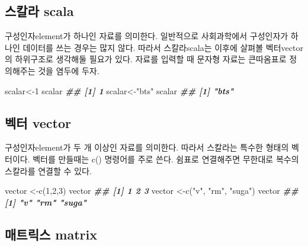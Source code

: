 \documentclass[
]{book}
\newenvironment{Shaded}{\begin{snugshade}}{\end{snugshade}}
\newcommand{\DecValTok}[1]{\textcolor[rgb]{0.00,0.00,0.81}{#1}}
\newcommand{\DocumentationTok}[1]{\textcolor[rgb]{0.56,0.35,0.01}{\textbf{\textit{#1}}}}
\newcommand{\FunctionTok}[1]{\textcolor[rgb]{0.00,0.00,0.00}{#1}}
\newcommand{\NormalTok}[1]{#1}
\newcommand{\OtherTok}[1]{\textcolor[rgb]{0.56,0.35,0.01}{#1}}
\newcommand{\StringTok}[1]{\textcolor[rgb]{0.31,0.60,0.02}{#1}}
\theoremstyle{definition}
\theoremstyle{definition}
\theoremstyle{definition}
\theoremstyle{definition}
\theoremstyle{remark}
\begin{document}
\hypertarget{uxc2a4uxce7cuxb77c-scala}{%
\subsection{스칼라 scala}\label{uxc2a4uxce7cuxb77c-scala}}

구성인자element가 하나인 자료를 의미한다. 일반적으로 사회과학에서 구성인자가 하나인 데이터를 쓰는 경우는 많지 않다. 따라서 스칼라scala는 이후에 살펴볼 벡터vector의 하위구조로 생각해둘 필요가 있다. 자료를 입력할 때 문자형 자료는 큰따옴표로 정의해주는 것을 염두에 두자.

\begin{Shaded}
\begin{Highlighting}[]
\NormalTok{scalar}\OtherTok{\textless{}{-}}\DecValTok{1}
\NormalTok{scalar}
\DocumentationTok{\#\# [1] 1}
\NormalTok{scalar}\OtherTok{\textless{}{-}}\StringTok{"bts"}
\NormalTok{scalar}
\DocumentationTok{\#\# [1] "bts"}
\end{Highlighting}
\end{Shaded}

\hypertarget{uxbca1uxd130-vector}{%
\subsection{벡터 vector}\label{uxbca1uxd130-vector}}

구성인자element가 두 개 이상인 자료를 의미한다. 따라서 스칼라는 특수한 형태의 벡터이다. 벡터를 만들때는 c() 명령어를 주로 쓴다. 쉼표로 연결해주면 무한대로 복수의 스칼라를 연결할 수 있다.

\begin{Shaded}
\begin{Highlighting}[]
\NormalTok{vector }\OtherTok{\textless{}{-}}\FunctionTok{c}\NormalTok{(}\DecValTok{1}\NormalTok{,}\DecValTok{2}\NormalTok{,}\DecValTok{3}\NormalTok{)}
\NormalTok{vector}
\DocumentationTok{\#\# [1] 1 2 3}
\NormalTok{vector }\OtherTok{\textless{}{-}}\FunctionTok{c}\NormalTok{(}\StringTok{"v"}\NormalTok{, }\StringTok{"rm"}\NormalTok{, }\StringTok{"suga"}\NormalTok{)}
\NormalTok{vector}
\DocumentationTok{\#\# [1] "v"    "rm"   "suga"}
\end{Highlighting}
\end{Shaded}

\hypertarget{uxb9e4uxd2b8uxb9aduxc2a4-matrix}{%
\subsection{매트릭스 matrix}\label{uxb9e4uxd2b8uxb9aduxc2a4-matrix}}
\end{document}
